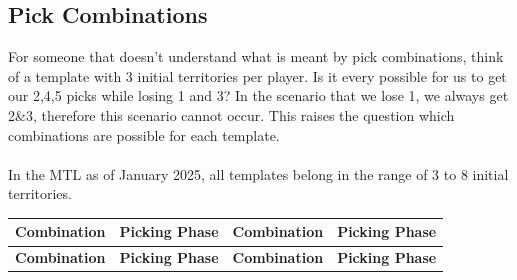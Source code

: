 \subsection{Pick Combinations}

For someone that doesn't understand what is meant by pick combinations, think of a template with 3 initial territories per player. Is it every possible for us to get our 2,4,5 picks while losing 1 and 3? In the scenario that we lose 1, we always get 2\&3, therefore this scenario cannot occur. This raises the question which combinations are possible for each template.
\\
\\
In the MTL as of January 2025, all templates belong in the range of 3 to 8 initial territories.

\small
\begin{longtable}{|p{2.5cm}|p{2.5cm}||p{2.5cm}|p{2.5cm}|}
\hline
\rowcolor{black!20}
\textbf{Combination} & \textbf{Picking Phase} & \textbf{Combination} & \textbf{Picking Phase} \\ \hline
\endfirsthead

\hline
\rowcolor{black!20}
\textbf{Combination} & \textbf{Picking Phase} & \textbf{Combination} & \textbf{Picking Phase} \\ \hline
\endhead


\end{longtable}

